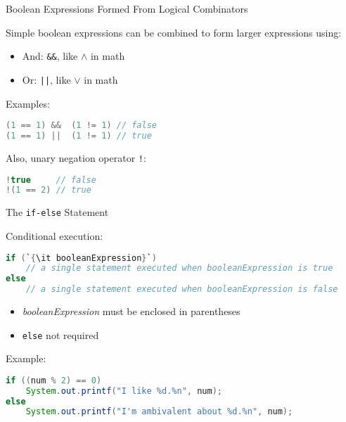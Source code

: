 \documentclass{beamer}
\begin{document}
\begin{frame}[fragile]{Boolean Expressions Formed From Logical Combinators}


Simple boolean expressions can be combined to form larger expressions using:
\begin{itemize}
\item And: {\tt \&\&}, like $\land$ in math
\item Or: {\tt ||}, like $\lor$ in math
\end{itemize}
Examples:
\begin{lstlisting}[language=Java]
(1 == 1) &&  (1 != 1) // false
(1 == 1) ||  (1 != 1) // true
\end{lstlisting}

Also, unary negation operator {\tt !}:

\begin{lstlisting}[language=Java]
!true     // false
!(1 == 2) // true
\end{lstlisting}


\end{frame}

\begin{frame}[fragile]{The {\tt if-else} Statement}


Conditional execution:
\begin{lstlisting}[language=Java,escapechar=`]
if (`{\it booleanExpression}`)
    // a single statement executed when booleanExpression is true
else
    // a single statement executed when booleanExpression is false
\end{lstlisting}
\vspace{-.1in}
\begin{itemize}
\item {\it booleanExpression} must be enclosed in parentheses
\item {\tt else} not required
\end{itemize}

Example:
\begin{lstlisting}[language=Java]
if ((num % 2) == 0)
    System.out.printf("I like %d.%n", num);
else
    System.out.printf("I'm ambivalent about %d.%n", num);
\end{lstlisting}

\end{frame}
\end{document}
